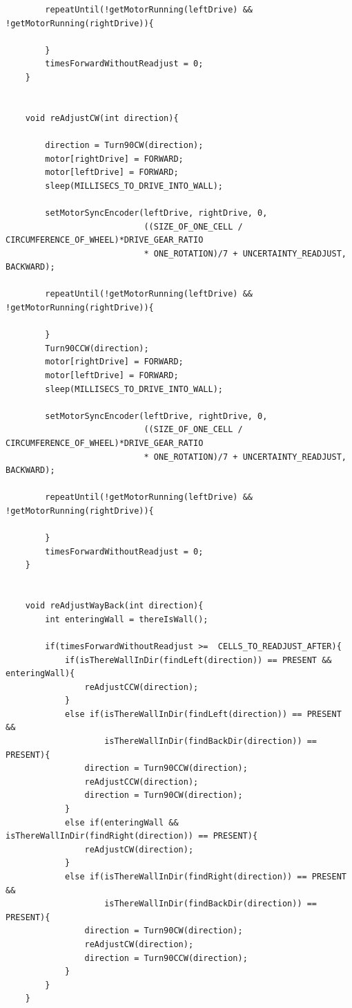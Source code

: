 \documentclass[11pt]{article}
\begin{document}
\begin{linenumbers}
\begin{verbatim}
        repeatUntil(!getMotorRunning(leftDrive) && !getMotorRunning(rightDrive)){

        }
        timesForwardWithoutReadjust = 0;
    }


    void reAdjustCW(int direction){

        direction = Turn90CW(direction);
        motor[rightDrive] = FORWARD;
        motor[leftDrive] = FORWARD;
        sleep(MILLISECS_TO_DRIVE_INTO_WALL);

        setMotorSyncEncoder(leftDrive, rightDrive, 0,
                            ((SIZE_OF_ONE_CELL / CIRCUMFERENCE_OF_WHEEL)*DRIVE_GEAR_RATIO 
                            * ONE_ROTATION)/7 + UNCERTAINTY_READJUST, BACKWARD);

        repeatUntil(!getMotorRunning(leftDrive) && !getMotorRunning(rightDrive)){

        }
        Turn90CCW(direction);
        motor[rightDrive] = FORWARD;
        motor[leftDrive] = FORWARD;
        sleep(MILLISECS_TO_DRIVE_INTO_WALL);

        setMotorSyncEncoder(leftDrive, rightDrive, 0,
                            ((SIZE_OF_ONE_CELL / CIRCUMFERENCE_OF_WHEEL)*DRIVE_GEAR_RATIO 
                            * ONE_ROTATION)/7 + UNCERTAINTY_READJUST, BACKWARD);

        repeatUntil(!getMotorRunning(leftDrive) && !getMotorRunning(rightDrive)){

        }
        timesForwardWithoutReadjust = 0;
    }


    void reAdjustWayBack(int direction){
        int enteringWall = thereIsWall();

        if(timesForwardWithoutReadjust >=  CELLS_TO_READJUST_AFTER){
            if(isThereWallInDir(findLeft(direction)) == PRESENT && enteringWall){
                reAdjustCCW(direction);
            }
            else if(isThereWallInDir(findLeft(direction)) == PRESENT && 
                    isThereWallInDir(findBackDir(direction)) == PRESENT){
                direction = Turn90CCW(direction);
                reAdjustCCW(direction);
                direction = Turn90CW(direction);
            }
            else if(enteringWall && isThereWallInDir(findRight(direction)) == PRESENT){
                reAdjustCW(direction);
            }
            else if(isThereWallInDir(findRight(direction)) == PRESENT && 
           	        isThereWallInDir(findBackDir(direction)) == PRESENT){
                direction = Turn90CW(direction);
                reAdjustCW(direction);
                direction = Turn90CCW(direction);
            }
        }
    }



\end{verbatim}
\end{linenumbers}
\end{document}
